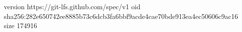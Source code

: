 version https://git-lfs.github.com/spec/v1
oid sha256:282e650742ee8885b73c6dcb3fa6bbf9acde4cae70bde913ea4ec50606c9ac16
size 174916
